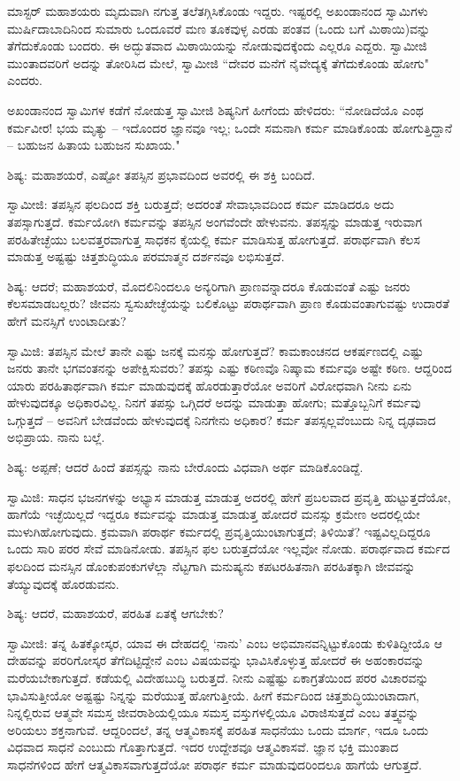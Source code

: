 ಮಾಸ್ಟರ್ ಮಹಾಶಯರು ಮೃದುವಾಗಿ ನಗುತ್ತ ತಲೆತಗ್ಗಿಸಿಕೊಂಡು ಇದ್ದರು. ಇಷ್ಟರಲ್ಲಿ ಅಖಂಡಾನಂದ ಸ್ವಾಮಿಗಳು ಮುರ್ಷಿದಾಬಾದಿನಿಂದ ಸುಮಾರು ಒಂದೂವರೆ ಮಣ ತೂಕವುಳ್ಳ ಎರಡು ಪಂತವ (ಒಂದು ಬಗೆ ಮಿಠಾಯಿ)ವನ್ನು ತೆಗೆದುಕೊಂಡು ಬಂದರು. ಈ ಅದ್ಭುತವಾದ ಮಿಠಾಯಿಯನ್ನು ನೋಡುವುದಕ್ಕೆಂದು ಎಲ್ಲರೂ ಎದ್ದರು. ಸ್ವಾಮೀಜಿ ಮುಂತಾದವರಿಗೆ ಅದನ್ನು ತೋರಿಸಿದ ಮೇಲೆ, ಸ್ವಾಮೀಜಿ “ದೇವರ ಮನೆಗೆ ನೈವೇದ್ಯಕ್ಕೆ ತೆಗೆದುಕೊಂಡು ಹೋಗು" ಎಂದರು.

ಅಖಂಡಾನಂದ ಸ್ವಾಮಿಗಳ ಕಡೆಗೆ ನೋಡುತ್ತ ಸ್ವಾಮೀಜಿ ಶಿಷ್ಯನಿಗೆ ಹೀಗೆಂದು ಹೇಳಿದರು: “ನೋಡಿದೆಯೊ ಎಂಥ ಕರ್ಮವೀರ! ಭಯ ಮೃತ್ಯು – ಇದೊಂದರ ಜ್ಞಾನವೂ ಇಲ್ಲ; ಒಂದೇ ಸಮನಾಗಿ ಕರ್ಮ ಮಾಡಿಕೊಂಡು ಹೋಗುತ್ತಿದ್ದಾನೆ – ಬಹುಜನ ಹಿತಾಯ ಬಹುಜನ ಸುಖಾಯ."

ಶಿಷ್ಯ: ಮಹಾಶಯರೆ, ಎಷ್ಟೋ ತಪಸ್ಸಿನ ಪ್ರಭಾವದಿಂದ ಅವರಲ್ಲಿ ಈ ಶಕ್ತಿ ಬಂದಿದೆ.

ಸ್ವಾಮೀಜಿ: ತಪಸ್ಸಿನ ಫಲದಿಂದ ಶಕ್ತಿ ಬರುತ್ತದೆ; ಅದರಂತೆ ಸೇವಾಭಾವದಿಂದ ಕರ್ಮ ಮಾಡಿದರೂ ಅದು ತಪಸ್ಸಾಗುತ್ತದೆ. ಕರ್ಮಯೋಗಿ ಕರ್ಮವನ್ನು ತಪಸ್ಸಿನ ಅಂಗವೆಂದೇ ಹೇಳುವನು. ತಪಸ್ಸನ್ನು ಮಾಡುತ್ತ ಇರುವಾಗ ಪರಹಿತೇಚ್ಛೆಯು ಬಲವತ್ತರವಾಗುತ್ತ ಸಾಧಕನ ಕೈಯಲ್ಲಿ ಕರ್ಮ ಮಾಡಿಸುತ್ತ ಹೋಗುತ್ತದೆ. ಪರಾರ್ಥವಾಗಿ ಕೆಲಸ ಮಾಡುತ್ತ ಅಷ್ಟಷ್ಟು ಚಿತ್ತಶುದ್ಧಿಯೂ ಪರಮಾತ್ಮನ ದರ್ಶನವೂ ಲಭಿಸುತ್ತದೆ.

ಶಿಷ್ಯ: ಆದರೆ; ಮಹಾಶಯರೆ, ಮೊದಲಿನಿಂದಲೂ ಅನ್ಯರಿಗಾಗಿ ಪ್ರಾಣವನ್ನಾದರೂ ಕೊಡುವಂತೆ ಎಷ್ಟು ಜನರು ಕೆಲಸಮಾಡಬಲ್ಲರು? ಜೀವನು ಸ್ವಸುಖೇಚ್ಛೆಯನ್ನು ಬಲಿಕೊಟ್ಟು ಪರಾರ್ಥವಾಗಿ ಪ್ರಾಣ ಕೊಡುವಂತಾಗುವಷ್ಟು ಉದಾರತೆ ಹೇಗೆ ಮನಸ್ಸಿಗೆ ಉಂಟಾದೀತು?

ಸ್ವಾಮಿಜಿ: ತಪಸ್ಸಿನ ಮೇಲೆ ತಾನೇ ಎಷ್ಟು ಜನಕ್ಕೆ ಮನಸ್ಸು ಹೋಗುತ್ತದೆ? ಕಾಮಕಾಂಚನದ ಆಕರ್ಷಣದಲ್ಲಿ ಎಷ್ಟು ಜನರು ತಾನೇ ಭಗವಂತನನ್ನು ಅಪೇಕ್ಷಿಸುವರು? ತಪಸ್ಸು ಎಷ್ಟು ಕಠಿಣವೊ ನಿಷ್ಕಾಮ ಕರ್ಮವೂ ಅಷ್ಟೇ ಕಠಿಣ. ಆದ್ದರಿಂದ ಯಾರು ಪರಹಿತಾರ್ಥವಾಗಿ ಕರ್ಮ ಮಾಡುವುದಕ್ಕೆ ಹೊರಡುತ್ತಾರೆಯೋ ಅವರಿಗೆ ವಿರೋಧವಾಗಿ ನೀನು ಏನು ಹೇಳುವುದಕ್ಕೂ ಅಧಿಕಾರವಿಲ್ಲ. ನಿನಗೆ ತಪಸ್ಸು ಒಗ್ಗಿದರೆ ಅದನ್ನು ಮಾಡುತ್ತಾ ಹೋಗು; ಮತ್ತೊಬ್ಬನಿಗೆ ಕರ್ಮವು ಒಗ್ಗುತ್ತದೆ – ಅವನಿಗೆ ಬೇಡವೆಂದು ಹೇಳುವುದಕ್ಕೆ ನಿನಗೇನು ಅಧಿಕಾರ? ಕರ್ಮ ತಪಸ್ಸಲ್ಲವೆಂಬುದು ನಿನ್ನ ದೃಢವಾದ ಅಭಿಪ್ರಾಯ. ನಾನು ಬಲ್ಲೆ.

ಶಿಷ್ಯ: ಅಪ್ಪಣೆ; ಆದರೆ ಹಿಂದೆ ತಪಸ್ಸನ್ನು ನಾನು ಬೇರೊಂದು ವಿಧವಾಗಿ ಅರ್ಥ ಮಾಡಿಕೊಂಡಿದ್ದೆ.

ಸ್ವಾಮಿಜಿ: ಸಾಧನ ಭಜನಗಳನ್ನು ಅಭ್ಯಾಸ ಮಾಡುತ್ತ ಮಾಡುತ್ತ ಅದರಲ್ಲಿ ಹೇಗೆ ಪ್ರಬಲವಾದ ಪ್ರವೃತ್ತಿ ಹುಟ್ಟುತ್ತದೆಯೋ, ಹಾಗೆಯೆ ಇಚ್ಛೆಯಿಲ್ಲದೆ ಇದ್ದರೂ ಕರ್ಮವನ್ನು ಮಾಡುತ್ತ ಮಾಡುತ್ತ ಹೋದರೆ ಮನಸ್ಸು ಕ್ರಮೇಣ ಅದರಲ್ಲಿಯೇ ಮುಳುಗಿಹೋಗುವುದು. ಕ್ರಮವಾಗಿ ಪರಾರ್ಥ ಕರ್ಮದಲ್ಲಿ ಪ್ರವೃತ್ತಿಯುಂಟಾಗುತ್ತದೆ; ತಿಳಿಯಿತೆ? ಇಷ್ಟವಿಲ್ಲದಿದ್ದರೂ ಒಂದು ಸಾರಿ ಪರರ ಸೇವೆ ಮಾಡಿನೋಡು. ತಪಸ್ಸಿನ ಫಲ ಬರುತ್ತದೆಯೋ ಇಲ್ಲವೋ ನೋಡು. ಪರಾರ್ಥವಾದ ಕರ್ಮದ ಫಲದಿಂದ ಮನಸ್ಸಿನ ಡೊಂಕುಪಂಕುಗಳೆಲ್ಲಾ ನೆಟ್ಟಗಾಗಿ ಮನುಷ್ಯನು ಕಪಟರಹಿತನಾಗಿ ಪರಹಿತಕ್ಕಾಗಿ ಜೀವವನ್ನು ತೆಯ್ಯುವುದಕ್ಕೆ ಹೊರಡುವನು.

ಶಿಷ್ಯ: ಆದರೆ, ಮಹಾಶಯರೆ, ಪರಹಿತ ಏತಕ್ಕೆ ಆಗಬೇಕು?

ಸ್ವಾಮೀಜಿ: ತನ್ನ ಹಿತಕ್ಕೋಸ್ಕರ, ಯಾವ ಈ ದೇಹದಲ್ಲಿ ‘ನಾನು’ ಎಂಬ ಅಭಿಮಾನವನ್ನಿಟ್ಟುಕೊಂಡು ಕುಳಿತಿದ್ದೀಯೊ ಆ ದೇಹವನ್ನು ಪರರಿಗೋಸ್ಕರ ತೆಗೆದಿಟ್ಟಿದ್ದೇನೆ ಎಂಬ ವಿಷಯವನ್ನು ಭಾವಿಸಿಕೊಳ್ಳುತ್ತ ಹೋದರೆ ಈ ಅಹಂಕಾರವನ್ನು ಮರೆಯಬೇಕಾಗುತ್ತದೆ. ಕಡೆಯಲ್ಲಿ ವಿದೇಹಬುದ್ಧಿ ಬರುತ್ತದೆ. ನೀನು ಎಷ್ಟೆಷ್ಟು ಏಕಾಗ್ರತೆಯಿಂದ ಪರರ ವಿಚಾರವನ್ನು ಭಾವಿಸುತ್ತೀಯೋ ಅಷ್ಟಷ್ಟು ನಿನ್ನನ್ನು ಮರೆಯುತ್ತ ಹೋಗುತ್ತೀಯೆ. ಹೀಗೆ ಕರ್ಮದಿಂದ ಚಿತ್ತಶುದ್ಧಿಯುಂಟಾದಾಗ, ನಿನ್ನಲ್ಲಿರುವ ಆತ್ಮವೇ ಸಮಸ್ತ ಜೀವರಾಶಿಯಲ್ಲಿಯೂ ಸಮಸ್ತ ವಸ್ತುಗಳಲ್ಲಿಯೂ ವಿರಾಜಿಸುತ್ತದೆ ಎಂಬ ತತ್ತ್ವವನ್ನು ಅರಿಯಲು ಶಕ್ತನಾಗುವೆ. ಆದ್ದರಿಂದಲೆ, ತನ್ನ ಆತ್ಮವಿಕಾಸಕ್ಕೆ ಪರಹಿತ ಸಾಧನೆಯು ಒಂದು ಮಾರ್ಗ, ಇದೂ ಒಂದು ವಿಧವಾದ ಸಾಧನೆ ಎಂಬುದು ಗೊತ್ತಾಗುತ್ತದೆ. ಇದರ ಉದ್ದೇಶವೂ ಆತ್ಮವಿಕಾಸವೆ. ಜ್ಞಾನ ಭಕ್ತಿ ಮುಂತಾದ ಸಾಧನೆಗಳಿಂದ ಹೇಗೆ ಆತ್ಮವಿಕಾಸವಾಗುತ್ತದೆಯೋ ಪರಾರ್ಥ ಕರ್ಮ ಮಾಡುವುದರಿಂದಲೂ ಹಾಗೆಯೆ ಆಗುತ್ತದೆ.

